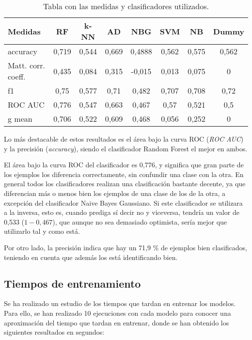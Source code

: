 \begin{table}[h]
	\begin{center}
		\begin{tabular}{ l c c c c c c c }
			\toprule
			\textbf{Medidas} & \textbf{RF} & \textbf{k-NN} & \textbf{AD} & \textbf{NBG} & \textbf{SVM} & \textbf{NB} & \textbf{Dummy} \\ \midrule
			accuracy & 0,719 & 0,544 & 0,669& 0,4888 & 0,562 & 0,575 & 0,562 \\
			Matt. corr. coeff. & 0,435 & 0,084 & 0,315 & -0,015 & 0,013 & 0,075 & 0 \\ 
			f1 & 0,75 & 0,577 & 0,71 & 0,482 & 0,707 & 0,708 & 0,72 \\
			ROC AUC & 0,776 & 0,547 & 0,663& 0,467 & 0,57 & 0,521 & 0,5 \\
			g mean & 0,706 & 0,522 & 0,609 & 0,468 & 0,056 & 0,252 & 0 \\ \bottomrule
		\end{tabular}
		\caption{Tabla con las medidas y clasificadores utilizados.}
		\label{tab:medidas}
	\end{center}
\end{table}

Lo más destacable de estos resultados es el área bajo la curva ROC (\textit{ROC AUC}) y la precisión (\textit{accuracy}), siendo el clasificador Random Forest el mejor en ambos.

El área bajo la curva ROC del clasificador es 0,776, y significa que gran parte de los ejemplos los diferencia correctamente, sin confundir una clase con la otra. En general todos los clasificadores realizan una clasificación bastante decente, ya que diferencian más o menos bien los ejemplos de una clase de los de la otra, a excepción del clasificador Naive Bayes Gaussiano. Si este clasificador se utilizara a la inversa, esto es, cuando prediga sí decir no y viceversa, tendría un valor de 0,533 ($1 - 0,467$), que aunque no sea demasiado optimista, sería mejor que utilizarlo tal y como está.

Por otro lado, la precisión indica que hay un 71,9 \% de ejemplos bien clasificados, teniendo en cuenta que además los está identificando bien. 

\subsection{Tiempos de entrenamiento}
Se ha realizado un estudio de los tiempos que tardan en entrenar los modelos. Para ello, se han realizado 10 ejecuciones con cada modelo para conocer una aproximación del tiempo que tardan en entrenar, donde se han obtenido los siguientes resultados en segundos:

